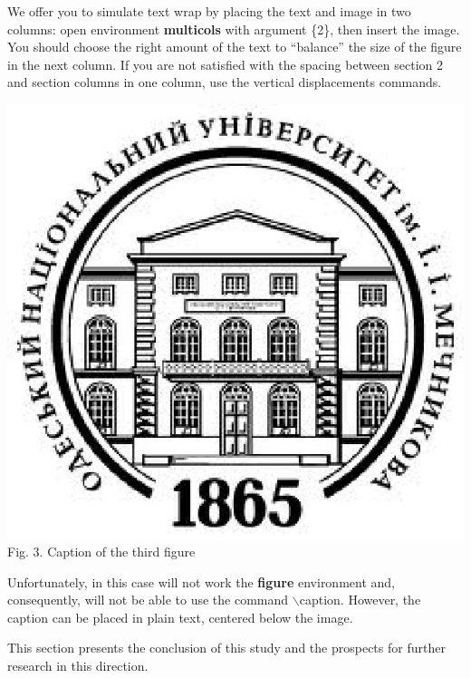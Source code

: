 \documentclass[11pt, twoside]{article}
\begin{document}
\begin{multicols}{2}

We offer you to simulate text wrap by placing the text and image in two
columns: open environment {\bf multicols} with argument \{2\}, then insert the
image.  You should choose the right amount of the text to ``balance'' the
size of the figure in the next column.  If you are not satisfied with the
spacing between section 2 and section columns in one column, use the vertical
displacements commands.

\begin{center}
	\includegraphics[scale=0.38]{onulogo.eps}\\	
	Fig. 3. Caption of the third figure
\end{center}

\end{multicols}

Unfortunately, in this case will not work the {\bf figure} environment and,
consequently, will not be able to use the command $\backslash$caption. 
However, the caption can be placed in plain text, centered below the image.

\Conclusion
This section presents the conclusion of this study and the prospects for further
research in this direction.


\renewcommand{\refname}{}
\end{document}
